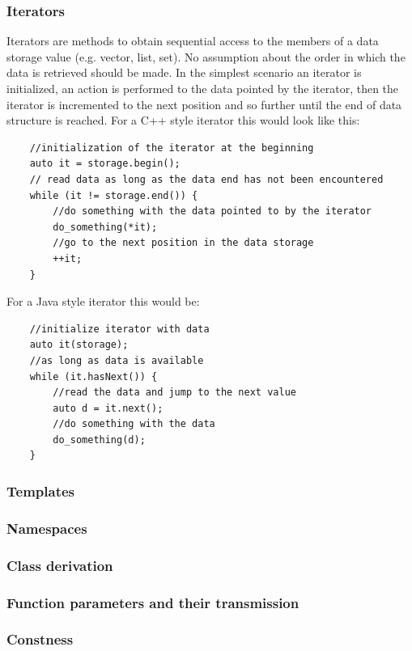 \documentclass{article}
\begin{document}
\subsubsection {Iterators}

Iterators are methods to obtain sequential access to the members of a data storage value (e.g. vector, list, set). No assumption about the order in which the data is retrieved should be made. In the simplest scenario an iterator is initialized, an action is performed to the data pointed by the iterator, then the iterator is incremented to the next position and so further until the end of data structure is reached. For a C++ style iterator this would look like this:

\begin{lstlisting}
	//initialization of the iterator at the beginning
	auto it = storage.begin();    
	// read data as long as the data end has not been encountered	
	while (it != storage.end()) {  
		//do something with the data pointed to by the iterator		
		do_something(*it);   
		//go to the next position in the data storage 
   		++it;   
	}
\end{lstlisting}

For a Java style iterator this would be:

\begin{lstlisting}
	//initialize iterator with data	
	auto it(storage);     
	//as long as data is available    
	while (it.hasNext()) { 
		//read the data and jump to the next value
		auto d = it.next();  
		//do something with the data
        do_something(d);  
    }
\end{lstlisting}
\subsubsection {Templates}
\subsubsection {Namespaces}
\subsubsection {Class derivation}
\subsubsection {Function parameters and their transmission}
\subsubsection {Constness}
\end{document}
